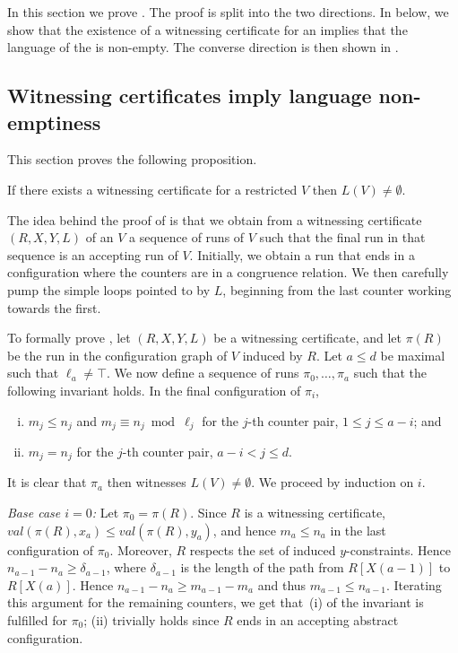 In this section we prove . The proof is split into the two directions. In
 below, we show that the existence of a witnessing
certificate for an \laVASS implies that the language of the \laVASS is
non-empty. The converse direction is then shown
in .

\subsection{Witnessing certificates imply language non-emptiness}\label{ssec:certificate-to-reachability}

This section proves the following proposition.
%
\begin{proposition}\label{lem:abstract-to-concrete}
  If there exists a witnessing certificate for a restricted \laVASS
  $V$ then $L(V)\neq \emptyset$.
\end{proposition}
%

The idea behind the proof of  is that
we obtain from a witnessing certificate $(R,X,Y,L)$ of an \laVASS $V$
a sequence of runs of $V$ such that the final run in that sequence is
an accepting run of $V$. Initially, we obtain a run that ends in a
configuration where the counters are in a congruence relation. We then
carefully pump the simple loops pointed to by $L$, beginning from the
last counter working towards the first.

To formally prove , let $(R,X,Y,L)$ be
a witnessing certificate, and let $\pi(R)$ be the run in the
configuration graph of $V$ induced by $R$. Let $a\le d$ be maximal
such that $\ell_a\neq \top$. We now define a sequence of runs
$\pi_0,\ldots,\pi_a$ such that the following invariant holds. In the final
configuration of $\pi_i$,
%
\begin{enumerate}[(i)]
\item $m_j \le n_j$ and $m_j\equiv n_j \bmod \ell_j$ for the $j$-th
  counter pair, $1\le j \le a-i$; and
\item $m_j = n_j$ for the $j$-th counter pair, $a-i<j\le d$.
\end{enumerate}
%
It is clear that $\pi_a$ then witnesses $L(V)\neq \emptyset$. We
proceed by induction on $i$.

\emph{Base case $i=0$:} Let $\pi_0=\pi(R)$. Since $R$
is a witnessing certificate, $val(\pi(R),x_a)\leq val(\pi(R),y_a)$, and hence
$m_a \le n_a$ in the last configuration of $\pi_0$.
Moreover, $R$ respects the set of induced $y$-constraints. Hence
$n_{a-1} - n_a \ge \delta_{a-1}$, where $\delta_{a-1}$ is the length
of the path from $R[X(a-1)]$ to $R[X(a)]$. Hence $n_{a-1} - n_a \ge
m_{a-1} - m_a$ and thus $m_{a-1} \le n_{a-1}$. Iterating this argument
for the remaining counters, we get that~(i) of the invariant is
fulfilled for $\pi_0$; (ii) trivially holds since $R$ ends in an
accepting abstract configuration.
%


